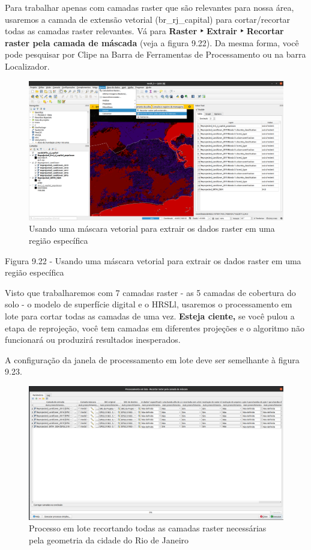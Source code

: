 \documentclass[
]{book}
\begin{document}
Para trabalhar apenas com camadas raster que são relevantes para nossa área, usaremos a camada de extensão vetorial (br\_rj\_capital) para cortar/recortar todas as camadas raster relevantes. Vá para \textbf{Raster ‣ Extrair ‣ Recortar raster pela camada de máscada} (veja a figura 9.22). Da mesma forma, você pode pesquisar por Clipe na Barra de Ferramentas de Processamento ou na barra Localizador.

\begin{figure}
\centering
\includegraphics{media/modulo9/fig922.png}
\caption{Usando uma máscara vetorial para extrair os dados raster em uma região específica}
\end{figure}

Figura 9.22 - Usando uma máscara vetorial para extrair os dados raster em uma região específica

Visto que trabalharemos com 7 camadas raster - as 5 camadas de cobertura do solo - o modelo de superfície digital e o HRSLl, usaremos o processamento em lote para cortar todas as camadas de uma vez. \textbf{Esteja ciente,} se você pulou a etapa de reprojeção, você tem camadas em diferentes projeções e o algoritmo não funcionará ou produzirá resultados inesperados.

A configuração da janela de processamento em lote deve ser semelhante à figura 9.23.

\begin{figure}
\centering
\includegraphics{media/modulo9/fig923.png}
\caption{Processo em lote recortando todas as camadas raster necessárias pela geometria da cidade do Rio de Janeiro}
\end{figure}
\end{document}
